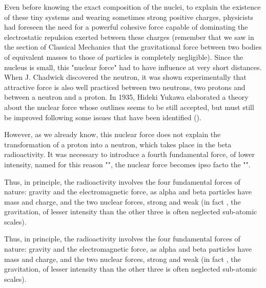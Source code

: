 	
	Even before knowing the exact composition of the nuclei, to explain the existence of these tiny systems and wearing sometimes strong positive charges, physicists had foreseen the need for a powerful cohesive force capable of dominating the electrostatic repulsion exerted between these charges (remember that we saw in the section of Classical Mechanics that the gravitational force between two bodies of equivalent masses to those of particles is completely negligible). Since the nucleus is small, this "nuclear force" had to have influence at very short distances. When J. Chadwick discovered the neutron, it was shown experimentally that attractive force is also well practiced between two neutrons, two protons and between a neutron and a proton. In 1935, Hideki Yukawa elaborated a theory about the nuclear force whose outlines seems to be still accepted, but must still be improved following some issues that have been identified ().
	
	However, as we already know, this nuclear force does not explain the transformation of a proton into a neutron, which takes place in the beta radioactivity. It was necessary to introduce a fourth fundamental force, of lower intensity, named for this reason "", the nuclear force becomes ipso facto the "".
	
	Thus, in principle, the radioactivity involves the four fundamental forces of nature: gravity and the electromagnetic force, as alpha and beta particles have mass and charge, and the two nuclear forces, strong and weak (in fact , the gravitation, of lesser intensity than the other three is often neglected  sub-atomic scales).
	
	Thus, in principle, the radioactivity involves the four fundamental forces of nature: gravity and the electromagnetic force, as alpha and beta particles have mass and charge, and the two nuclear forces, strong and weak (in fact , the gravitation, of lesser intensity than the other three is often neglected  sub-atomic scales).
	

